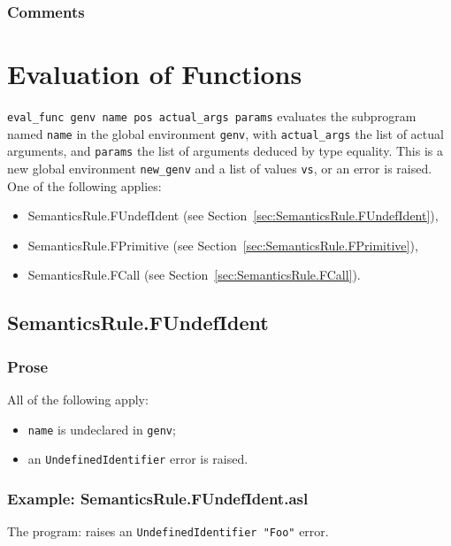 \documentclass{book}
\begin{document}
    \subsection{Comments}

\chapter{Evaluation of Functions \label{chap:eval_func}}
\texttt{eval\_func genv name pos actual\_args params} evaluates the subprogram \\
named \texttt{name} in the global environment \texttt{genv}, with
\texttt{actual\_args} the list of actual arguments, and \texttt{params} the
list of arguments deduced by type equality. This is a new global environment
\texttt{new\_genv} and a list of values \texttt{vs}, or an error is raised.
One of the following applies:
\begin{itemize}
\item SemanticsRule.FUndefIdent (see Section~\ref{sec:SemanticsRule.FUndefIdent}),
\item SemanticsRule.FPrimitive (see Section~\ref{sec:SemanticsRule.FPrimitive}),
\item SemanticsRule.FCall (see Section~\ref{sec:SemanticsRule.FCall}).
\end{itemize}

\section{SemanticsRule.FUndefIdent \label{sec:SemanticsRule.FUndefIdent}}

  \subsection{Prose}
  All of the following apply:
  \begin{itemize}
  \item \texttt{name} is undeclared in \texttt{genv};
  \item an \texttt{UndefinedIdentifier} error is raised.
  \end{itemize}

  \subsection{Example: SemanticsRule.FUndefIdent.asl}
  The program:
  raises an \texttt{UndefinedIdentifier "Foo"} error.
\end{document}
